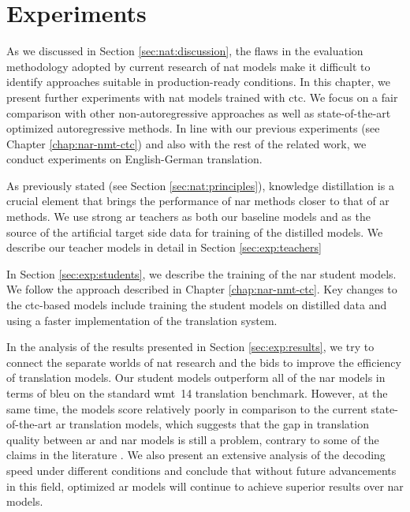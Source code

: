 \chapter{Experiments}%
\label{chap:experiments}


As we discussed in Section \ref{sec:nat:discussion}, the flaws in the
evaluation methodology adopted by current research of \ac{nat} models make it
difficult to identify approaches suitable in production-ready conditions.  In
this chapter, we present further experiments with \ac{nat} models trained with
\ac{ctc}. We focus on a fair comparison with other non-autoregressive
approaches as well as state-of-the-art optimized autoregressive methods.  In
line with our previous experiments (see Chapter \ref{chap:nar-nmt-ctc}) and
also with the rest of the related work, we conduct experiments on
English-German translation.

As previously stated (see Section \ref{sec:nat:principles}), knowledge
distillation \citep{kim-rush-2016-sequence} is a crucial element that brings
the performance of \ac{nar} methods closer to that of \ac{ar} methods. We use
strong \ac{ar} teachers as both our baseline models and as the source of the
artificial target side data for training of the distilled models. We describe
our teacher models in detail in Section \ref{sec:exp:teachers}

In Section \ref{sec:exp:students}, we describe the training of the \ac{nar}
student models. We follow the approach described in Chapter
\ref{chap:nar-nmt-ctc}. Key changes to the \acs{ctc}-based models include
training the student models on distilled data and using a faster implementation
of the translation system.

In the analysis of the results presented in Section \ref{sec:exp:results}, we
try to connect the separate worlds of \ac{nat} research and the bids to improve
the efficiency of translation models. Our student models outperform all of the
\ac{nar} models in terms of \acs{bleu} on the standard \acs{wmt}~14 translation
benchmark. However, at the same time, the models score relatively poorly in
comparison to the current state-of-the-art \ac{ar} translation models, which
suggests that the gap in translation quality between \ac{ar} and \ac{nar}
models is still a problem, contrary to some of the claims in the literature
\citep{gu-kong-2021-fully,saharia-etal-2020-non}. We also present an extensive
analysis of the decoding speed under different conditions and conclude that
without future advancements in this field, optimized \ac{ar} models will
continue to achieve superior results over \ac{nar} models.


